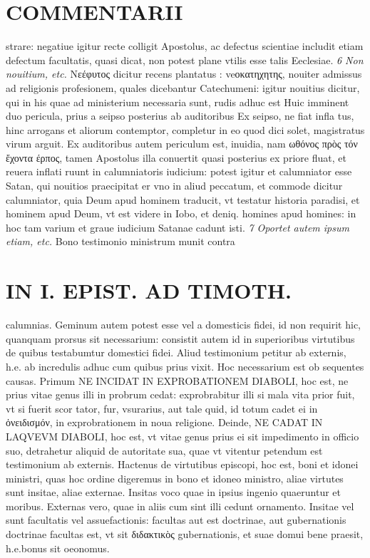 \documentclass{article}
\begin{document}
\begin{pages}
\section*{COMMENTARII }
\marginpar{[ p.68 ]}\pstart strare: negatiue igitur recte colligit Apostolus, ac defectus scientiae includit etiam defectum facultatis, quasi dicat, non potest plane vtilis esse talis Eeclesiae.  \pend
\textit{6 Non nouitium, etc. }\pstart Νεέφυτος dicitur recens plantatus : veοκατηχητης, nouiter admissus ad religionis profesionem, quales dicebantur Catechumeni: igitur nouitius dicitur, qui in his quae ad ministerium necessaria sunt, rudis adhuc est Huic imminent duo pericula, prius a seipso posterius ab auditoribus  Ex seipso, ne fiat infla tus, hinc arrogans et aliorum contemptor, completur in eo quod dici solet, magistratus virum arguit. Ex auditoribus autem periculum est, inuidia, nam ωθόνος πρὸς τόν ἔχοντα έρπος, tamen Apostolus illa conuertit quasi posterius ex priore fluat, et reuera inflati ruunt in calumniatoris iudicium: potest igitur et calumniator esse Satan, qui nouitios praecipitat er vno in aliud peccatum, et commode dicitur calumniator, quia Deum apud hominem traducit, vt testatur historia paradisi, et hominem apud Deum, vt est videre in Iobo, et deniq. homines apud homines: in hoc tam varium et graue iudicium Satanae cadunt isti.  \pend
\textit{7 Oportet autem ipsum etiam, etc. }\pstart Bono testimonio ministrum munit contra  \pend
\section*{IN I. EPIST. AD TIMOTH. }
\marginpar{[ p.69 ]}\pstart calumnias. Geminum autem potest esse vel a domesticis fidei, id non requirit hic, quanquam prorsus sit necessarium: consistit autem id in superioribus  virtutibus  de quibus  testabumtur domestici fidei. Aliud testimonium petitur ab externis, h.e. ab incredulis adhuc cum quibus  prius vixit. Hoc necessarium est ob sequentes causas. Primum NE INCIDAT IN EXPROBATIONEM DIABOLI, hoc est, ne prius vitae genus illi in probrum cedat: exprobrabitur illi si mala vita prior fuit, vt si fuerit scor tator, fur, vsurarius, aut tale quid, id totum cadet ei in ὀνειδισμόν, in exprobrationem in noua religione. Deinde, NE CADAT IN LAQVEVM DIABOLI, hoc est, vt vitae genus prius ei sit impedimento in officio suo, detrahetur aliquid de autoritate sua, quae vt vitentur petendum est testimonium ab externis. Hactenus de virtutibus episcopi, hoc est, boni et idonei ministri, quas hoc ordine digeremus in bono et idoneo ministro, aliae virtutes sunt insitae, aliae externae. Insitas voco quae in ipsius ingenio quaeruntur et moribus. Externas vero, quae in aliis cum sint illi cedunt ornamento. Insitae vel sunt facultatis vel assuefactionis: facultas aut est doctrinae, aut gubernationis doctrinae facultas est, vt sit διδακτικὸς gubernationis, et suae domui bene praesit, h.e.bonus sit oeonomus.  \pend

\end{pages}
\end{document}
